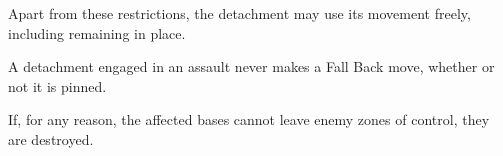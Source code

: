 Apart from these restrictions, the detachment may use its movement freely, including remaining in place.

A detachment engaged in an assault never makes a Fall Back move, whether or not it is pinned.

If, for any reason, the affected bases cannot leave enemy zones of control, they are destroyed.